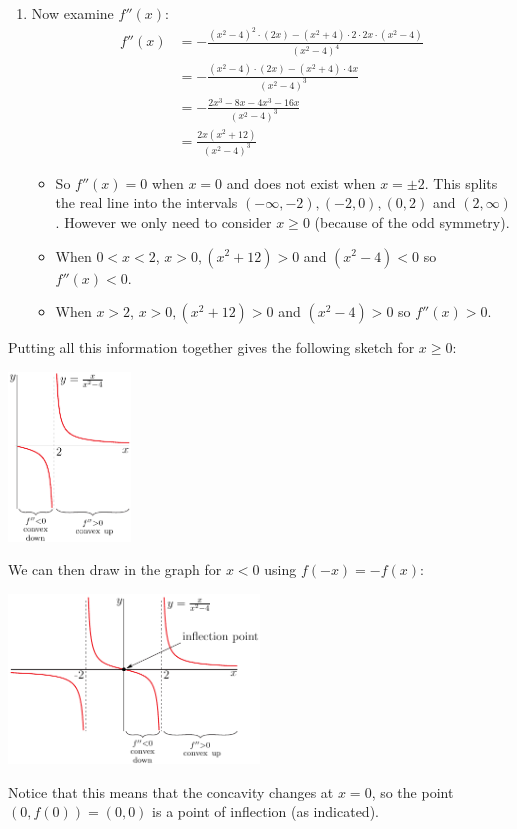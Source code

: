\begin{eg}[$f(x) = \dfrac{x}{x^2-4}$]
\begin{enumerate}[(1)]
\begin{itemize}
\end{itemize}
\item Now examine $f''(x)$:
\begin{align*}
f''(x)
&=- \frac{(x^2-4)^2\cdot(2x) - (x^2+4)\cdot2\cdot 2x\cdot(x^2-4)}{(x^2-4)^4}\\
&=- \frac{(x^2-4)\cdot(2x) - (x^2+4)\cdot4x}{(x^2-4)^3}\\
&=- \frac{2x^3-8x  - 4x^3-16x}{(x^2-4)^3}\\
&= \frac{2x(x^2+12)}{(x^2-4)^3}
\end{align*}
\begin{itemize}
\item So $f''(x)=0$ when $x=0$ and does not exist when $x=\pm 2$. This splits
the real line into the intervals $(-\infty,-2), (-2,0), (0,2)$ and
$(2,\infty)$. However we only need to consider $x \geq 0$ (because of the odd
symmetry).
 \item When $0<x<2$, $x>0, (x^2+12)>0$ and $(x^2-4)<0$ so  $f''(x)<0$.
 \item When $x>2$, $x>0, (x^2+12)>0$ and $(x^2-4)>0$ so $f''(x)>0$.
\end{itemize}
\end{enumerate}
Putting all this information together gives the following sketch for $x \geq 0$:
\begin{efig}
\begin{center}
   \includegraphics[height=45mm]{sketch5b}
\end{center}
\end{efig}
We can then draw in the graph for $x< 0$ using $f(-x) = -f(x)$:
\begin{efig}
\begin{center}
   \includegraphics[height=45mm]{sketch5}
\end{center}
\end{efig}
Notice that this means that the concavity changes at $x=0$, so the point
$(0,f(0))=(0,0)$ is a point of inflection (as indicated).
\end{eg}




